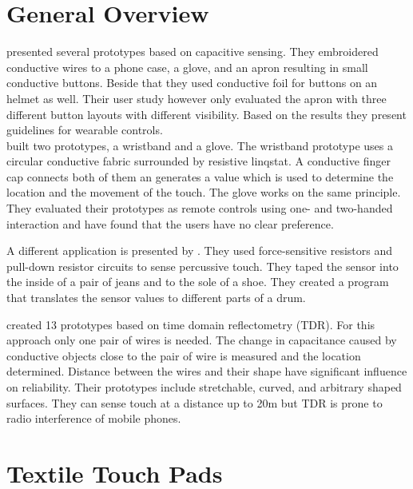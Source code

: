 \section{General Overview}
\cite{Holleis:2008:ECT:1409240.1409250} presented several prototypes based on capacitive sensing. They embroidered conductive wires to  a phone case, a glove, and an apron resulting in small conductive buttons. Beside that they used conductive foil for buttons on an helmet as well. Their user study however only evaluated the apron with three different button layouts with different visibility. Based on the results they present guidelines for wearable controls. \\

\cite{Speir:2014:WRC:2628363.2634221} built two prototypes, a wristband and a glove. The wristband prototype uses a circular conductive fabric surrounded by resistive linqstat. A conductive finger cap connects both of them an generates a value which is used to determine the location and the movement of the touch. The glove works on the same principle. They evaluated their prototypes as remote controls using one- and two-handed interaction and have found that the users have no clear preference. 

 A different application is presented by \cite{Smus:2010:UDT:1753846.1754094}. They used force-sensitive resistors and pull-down resistor circuits to sense percussive touch. They taped the sensor into the inside of a pair of jeans and to the sole of a shoe. They created a program that translates the sensor values to different parts of a drum. 

\citep{Wimmer:2011:MDT:2047196.2047264} created 13 prototypes based on time domain reflectometry (TDR). For this approach only one pair of wires is needed. The change in capacitance caused by conductive objects close to the pair of wire is measured and the location determined. Distance between the wires and their shape have significant influence on reliability. Their prototypes include stretchable, curved, and arbitrary shaped surfaces. They can sense touch at a distance up to 20m but TDR is prone to radio interference of mobile phones. 

\section{Textile Touch Pads}

